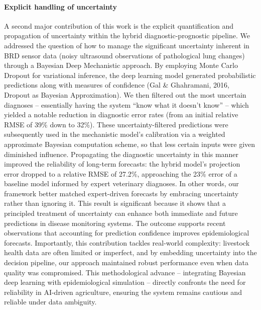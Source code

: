 \paragraph{Explicit handling of uncertainty}  A second major contribution of this work is the explicit quantification and propagation of uncertainty within the hybrid diagnostic-prognostic pipeline. We addressed the question of how to manage the significant uncertainty inherent in BRD sensor data (noisy ultrasound observations of pathological lung changes) through a Bayesian Deep Mechanistic approach. By employing Monte Carlo Dropout for variational inference, the deep learning model generated probabilistic predictions along with measures of confidence (Gal \& Ghahramani, 2016, Dropout as Bayesian Approximation). We then filtered out the most uncertain diagnoses – essentially having the system “know what it doesn’t know” – which yielded a notable reduction in diagnostic error rates (from an initial relative RMSE of 39\% down to 32\%). These uncertainty-filtered predictions were subsequently used in the mechanistic model’s calibration via a weighted approximate Bayesian computation scheme, so that less certain inputs were given diminished influence. Propagating the diagnostic uncertainty in this manner improved the reliability of long-term forecasts: the hybrid model’s projection error dropped to a relative RMSE of 27.2\%, approaching the 23\% error of a baseline model informed by expert veterinary diagnoses. In other words, our framework better matched expert-driven forecasts by embracing uncertainty rather than ignoring it. This result is significant because it shows that a principled treatment of uncertainty can enhance both immediate and future predictions in disease monitoring systems. The outcome supports recent observations that accounting for prediction confidence improves epidemiological forecasts. Importantly, this contribution tackles real-world complexity: livestock health data are often limited or imperfect, and by embedding uncertainty into the decision pipeline, our approach maintained robust performance even when data quality was compromised. This methodological advance – integrating Bayesian deep learning with epidemiological simulation – directly confronts the need for reliability in AI-driven agriculture, ensuring the system remains cautious and reliable under data ambiguity.


